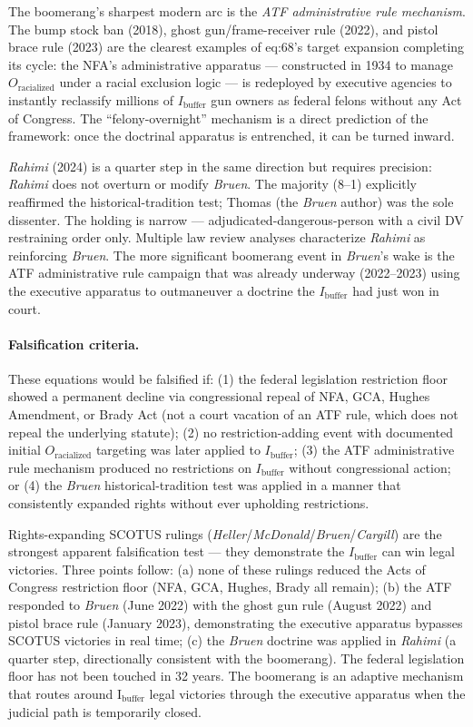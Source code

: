 The boomerang's sharpest modern arc is the \textit{ATF administrative rule mechanism}. The bump stock ban (2018), ghost gun/frame-receiver rule (2022), and pistol brace rule (2023) are the clearest examples of eq:68's target expansion completing its cycle: the NFA's administrative apparatus --- constructed in 1934 to manage $O_{\text{racialized}}$ under a racial exclusion logic --- is redeployed by executive agencies to instantly reclassify millions of $I_{\text{buffer}}$ gun owners as federal felons without any Act of Congress. The ``felony-overnight'' mechanism is a direct prediction of the framework: once the doctrinal apparatus is entrenched, it can be turned inward.

\textit{Rahimi} (2024) is a quarter step in the same direction but requires precision: \textit{Rahimi} does not overturn or modify \textit{Bruen}. The majority (8--1) explicitly reaffirmed the historical-tradition test; Thomas (the \textit{Bruen} author) was the sole dissenter. The holding is narrow --- adjudicated-dangerous-person with a civil DV restraining order only. Multiple law review analyses characterize \textit{Rahimi} as reinforcing \textit{Bruen}. The more significant boomerang event in \textit{Bruen}'s wake is the ATF administrative rule campaign that was already underway (2022--2023) using the executive apparatus to outmaneuver a doctrine the $I_{\text{buffer}}$ had just won in court.

\paragraph{Falsification criteria.}
These equations would be falsified if: (1) the federal legislation restriction floor showed a permanent decline via congressional repeal of NFA, GCA, Hughes Amendment, or Brady Act (not a court vacation of an ATF rule, which does not repeal the underlying statute); (2) no restriction-adding event with documented initial $O_{\text{racialized}}$ targeting was later applied to $I_{\text{buffer}}$; (3) the ATF administrative rule mechanism produced no restrictions on $I_{\text{buffer}}$ without congressional action; or (4) the \textit{Bruen} historical-tradition test was applied in a manner that consistently expanded rights without ever upholding restrictions.

Rights-expanding SCOTUS rulings (\textit{Heller}/\textit{McDonald}/\textit{Bruen}/\textit{Cargill}) are the strongest apparent falsification test --- they demonstrate the $I_{\text{buffer}}$ can win legal victories. Three points follow: (a) none of these rulings reduced the Acts of Congress restriction floor (NFA, GCA, Hughes, Brady all remain); (b) the ATF responded to \textit{Bruen} (June 2022) with the ghost gun rule (August 2022) and pistol brace rule (January 2023), demonstrating the executive apparatus bypasses SCOTUS victories in real time; (c) the \textit{Bruen} doctrine was applied in \textit{Rahimi} (a quarter step, directionally consistent with the boomerang). The federal legislation floor has not been touched in 32 years. The boomerang is an adaptive mechanism that routes around I$_{\text{buffer}}$ legal victories through the executive apparatus when the judicial path is temporarily closed.

